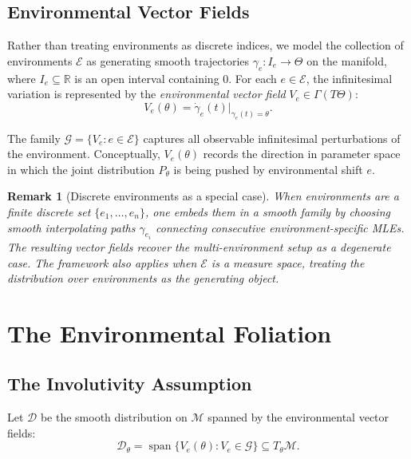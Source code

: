 \documentclass[11pt,a4paper]{article}
\newtheorem{remark}{Remark}
\DeclareMathOperator{\spa}{span}
\newcommand{\cM}{\mathcal{M}}
\newcommand{\cG}{\mathcal{G}}
\newcommand{\cD}{\mathcal{D}}
\newcommand{\cE}{\mathcal{E}}
\newcommand{\bR}{\mathbb{R}}
\begin{document}
\subsection{Environmental Vector Fields}

Rather than treating environments as discrete indices, we model the collection of environments $\cE$ as generating smooth trajectories $\gamma_e: I_e \to \Theta$ on the manifold, where $I_e \subseteq \bR$ is an open interval containing $0$. For each $e \in \cE$, the infinitesimal variation is represented by the \emph{environmental vector field} $V_e \in \Gamma(T\Theta)$:
\begin{equation}
V_e(\theta) = \dot{\gamma}_e(t)\big|_{\gamma_e(t) = \theta}.
\end{equation}

The family $\cG = \{V_e : e \in \cE\}$ captures all observable infinitesimal perturbations of the environment. Conceptually, $V_e(\theta)$ records the direction in parameter space in which the joint distribution $P_\theta$ is being pushed by environmental shift $e$.

\begin{remark}[Discrete environments as a special case]
When environments are a finite discrete set $\{e_1, \ldots, e_n\}$, one embeds them in a smooth family by choosing smooth interpolating paths $\gamma_{e_i}$ connecting consecutive environment-specific MLEs. The resulting vector fields recover the multi-environment setup as a degenerate case. The framework also applies when $\cE$ is a measure space, treating the distribution over environments as the generating object.
\end{remark}

\section{The Environmental Foliation}
\label{sec:foliation}

\subsection{The Involutivity Assumption}

Let $\cD$ be the smooth distribution on $\cM$ spanned by the environmental vector fields:
\[
\cD_\theta = \spa\{V_e(\theta) : V_e \in \cG\} \subseteq T_\theta \cM.
\]
\end{document}
